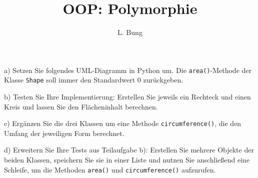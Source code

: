 \documentclass[11pt, a4paper, oneside]{article}
\begin{document}
	\author{L. Bung}
	\title{OOP: Polymorphie}
	\subject{SAE}
	\maketitle
	
	
	a) Setzen Sie folgendes UML-Diagramm in Python um.
	Die \texttt{area()}-Methode der Klasse \texttt{Shape} soll immer den Standardwert 0 zurückgeben.
	
	\begin{figure}[h]
		\centering
	\end{figure}
	
	b) Testen Sie Ihre Implementierung:
	Erstellen Sie jeweils ein Rechteck und einen Kreis und lassen Sie den Flächeninhalt berechnen.
	
	c) Ergänzen Sie die drei Klassen um eine Methode \texttt{circumference()}, die den Umfang der jeweiligen Form berechnet.
	
	d) Erweitern Sie Ihre Tests aus Teilaufgabe b): Erstellen Sie mehrere Objekte der beiden Klassen, speichern Sie sie in einer Liste und nutzen Sie anschließend eine Schleife, um die Methoden \texttt{area()} und \texttt{circumference()} aufzurufen.
	
\end{document}
